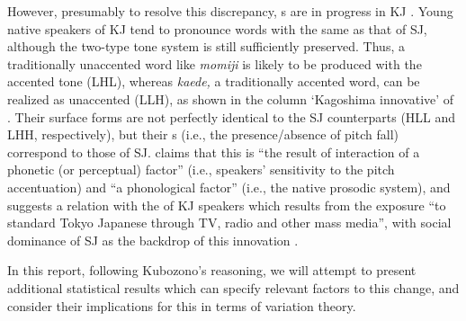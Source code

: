\documentclass[output=paper]{LSP/langsci}
\begin{document}
However, presumably to resolve this discrepancy, s are in progress in KJ \citep{kubozono_tonal_2007}. Young native speakers of KJ tend to pronounce words with the same  as that of SJ, although the two-type tone system is still sufficiently preserved. Thus, a traditionally unaccented word like \textit{momiji }is likely to be produced with the accented tone (LHL), whereas \textit{kaede,} a traditionally accented word, can be realized as unaccented (LLH), as shown in the column ‘Kagoshima innovative’ of . Their surface forms are not perfectly identical to the SJ counterparts (HLL and LHH, respectively), but their s (i.e., the presence/absence of pitch fall) correspond to those of SJ. \citet[348]{kubozono_tonal_2007} claims that this  is ``the result of interaction of a phonetic (or perceptual) factor'' (i.e., speakers' sensitivity to the pitch accentuation) and ``a phonological factor'' (i.e., the native prosodic system), and suggests a relation with the  of KJ speakers which results from the exposure ``to standard Tokyo Japanese through TV, radio and other mass media'', with social dominance of SJ as the backdrop of this innovation \citep[323]{kubozono_tonal_2007}.
 
\begin{table} 
\caption{Surface tone and accentuation in SJ, Traditional KJ and Innovative KJ.}
\label{tab:ota:2}
\end{table}

In this report, following Kubozono’s reasoning, we will attempt to present additional statistical results which can specify relevant factors to this change, and consider their implications for this  in terms of variation theory.
\end{document}
